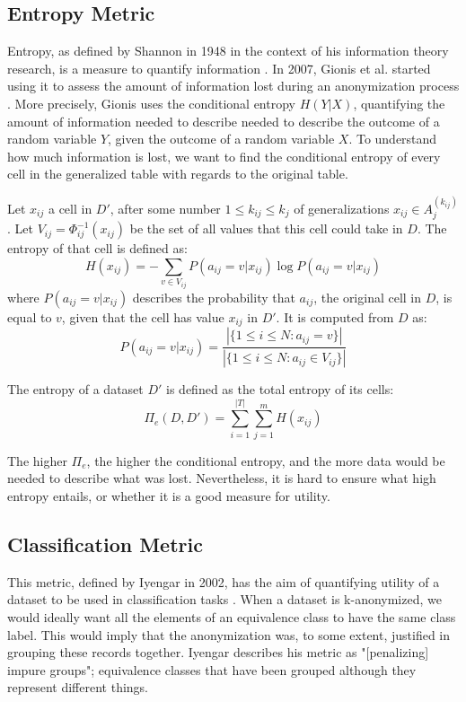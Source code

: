 \subsection{Entropy Metric}
Entropy, as defined by Shannon in 1948 in the context of his information theory research, is a measure to quantify information \cite{shannon_entropy}. In 2007, Gionis et al. started using it to assess the amount of information lost during an anonymization process \cite{entropy_measure}. More precisely, Gionis uses the conditional entropy $H(Y|X)$, quantifying the amount of information needed to describe needed to describe the outcome of a random variable $Y$, given the outcome of a random variable $X$. To understand how much information is lost, we want to find the conditional entropy of every cell in the generalized table with regards to the original table.

Let $x_{ij}$ a cell in $D'$, after some number $1 \leq k_{ij} \leq k_j$ of generalizations $x_{ij} \in A_j^{(k_{ij})}$. Let $V_{ij} = \Phi_{ij}^{-1}(x_{ij})$ be the set of all values that this cell could take in $D$. The entropy of that cell is defined as:
$$
    H(x_{ij}) = - \sum_{v \in V_{ij}} P(a_{ij} = v | x_{ij})\log P(a_{ij} = v | x_{ij})
$$
where $P(a_{ij}=v|x_{ij})$ describes the probability that $a_{ij}$, the original cell in $D$, is equal to $v$, given that the cell has value $x_{ij}$ in $D'$. It is computed from $D$ as:
$$
    P(a_{ij} = v|x_{ij}) = \frac{|\{1 \leq i \leq N: a_{ij}=v\}|}{|\{1 \leq i \leq N: a_{ij} \in V_{ij}\}|}
$$

The entropy of a dataset $D'$ is defined as the total entropy of its cells:
$$\Pi_e(D,D') = \sum\limits_{i=1}^{|T|} \sum\limits_{j=1}^{m} H(x_{ij})$$


The higher $\Pi_e$, the higher the conditional entropy, and the more data would be needed to describe what was lost. Nevertheless, it is hard to ensure what high entropy entails, or whether it is a good measure for utility.

\subsection{Classification Metric}
This metric, defined by Iyengar in 2002, has the aim of quantifying utility of a dataset to be used in classification tasks \cite{cm_granularity_metric}. When a dataset is k-anonymized, we would ideally want all the elements of an equivalence class to have the same class label. This would imply that the anonymization was, to some extent, justified in grouping these records together. Iyengar describes his metric as "[penalizing] impure groups"; equivalence classes that have been grouped although they represent different things.

